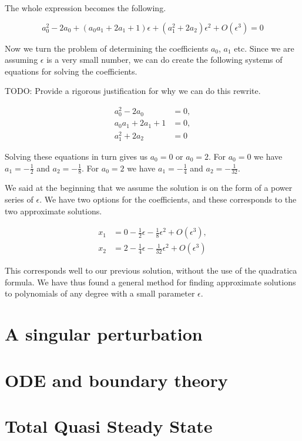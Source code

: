\documentclass[12pt]{article}
\begin{document}
The whole expression becomes the following.

\begin{equation}
a_0^2 - 2a_0 + (a_0 a_1 + 2 a_1 + 1)\epsilon + (a_1^2 + 2 a_2)\epsilon^2 +
O(\epsilon^3) = 0
\end{equation}

Now we turn the problem of determining the coefficients $a_0$, $a_1$ etc. Since
we are assuming $\epsilon$ is a very small number, we can do create the
following systems of equations for solving the coefficients.

TODO: Provide a rigorous justification for why we can do this rewrite.

\begin{align*}
a_0^2 - 2 a_0 &=0, \\
a_0 a_1 + 2 a_1 + 1 &= 0, \\
a_1^2 + 2 a_2 &= 0
\end{align*}

Solving these equations in turn gives us $a_0 = 0$ or $a_0 = 2$. For $a_0 = 0$ we
have $a_1 = - \frac{1}{2}$ and $a_2 = - \frac{1}{8}$. For $a_0 = 2$ we have $a_1 = -
\frac{1}{4}$ and $a_2 = - \frac{1}{32}$.

We said at the beginning that we assume the solution is on the form of a power
series of $\epsilon$. We have two options for the coefficients, and these
corresponds to the two approximate solutions.

\begin{align*}
x_1 &= 0 - \frac{1}{2} \epsilon - \frac{1}{8} \epsilon^2 + O(\epsilon^3), \\
x_2 &= 2 - \frac{1}{4} \epsilon - \frac{1}{32} \epsilon^2 + O(\epsilon^3)
\end{align*}

This corresponds well to our previous solution, without the use of the
quadratica formula. We have thus found a general method for finding approximate
solutions to polynomials of any degree with a small parameter $\epsilon$.

\section{A singular perturbation}
\section{ODE and boundary theory}
\section{Total Quasi Steady State}
\end{document}
